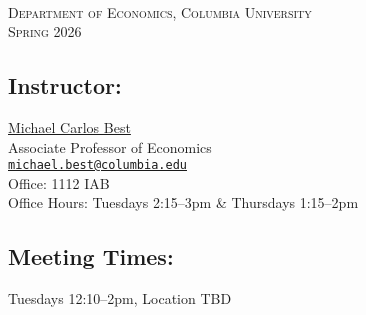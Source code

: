 \documentclass[11pt]{article}
\begin{document}


 \\
\textsc{Department of Economics, Columbia University} \\
\textsc{Spring 2026}

\subsection*{Instructor:}
\href{http://www.columbia.edu/~mcb2270/}{Michael Carlos Best} \\
Associate Professor of Economics \\
\href{mailto:michael.best@columbia.edu}{\nolinkurl{michael.best@columbia.edu}} \\
Office: 1112 IAB \\
Office Hours: Tuesdays 2:15--3pm \& Thursdays 1:15--2pm

\subsection*{Meeting Times:}
Tuesdays 12:10--2pm, Location TBD
\end{document}
